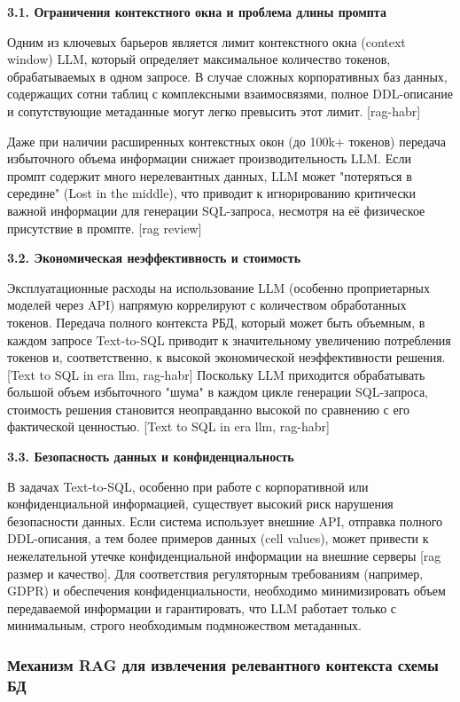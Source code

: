 \textbf{3.1. Ограничения контекстного окна и проблема длины промпта}

Одним из ключевых барьеров является лимит контекстного окна (context window) LLM, который определяет максимальное количество токенов, обрабатываемых в одном запросе. В случае сложных корпоративных баз данных, содержащих сотни таблиц с комплексными взаимосвязями, полное DDL-описание и сопутствующие метаданные могут легко превысить этот лимит. [rag-habr]

Даже при наличии расширенных контекстных окон (до 100k+ токенов) передача избыточного объема информации снижает производительность LLM. Если промпт содержит много нерелевантных данных, LLM может "потеряться в середине" (Lost in the middle), что приводит к игнорированию критически важной информации для генерации SQL-запроса, несмотря на её физическое присутствие в промпте. [rag review]

\textbf{3.2. Экономическая неэффективность и стоимость}

Эксплуатационные расходы на использование LLM (особенно проприетарных моделей через API) напрямую коррелируют с количеством обработанных токенов. Передача полного контекста РБД, который может быть объемным, в каждом запросе Text-to-SQL приводит к значительному увеличению потребления токенов и, соответственно, к высокой экономической неэффективности решения. [Text to SQL in era llm, rag-habr] Поскольку LLM приходится обрабатывать большой объем избыточного "шума" в каждом цикле генерации SQL-запроса, стоимость решения становится неоправданно высокой по сравнению с его фактической ценностью. [Text to SQL in era llm, rag-habr]

\textbf{3.3. Безопасность данных и конфиденциальность}

В задачах Text-to-SQL, особенно при работе с корпоративной или конфиденциальной информацией, существует высокий риск нарушения безопасности данных. Если система использует внешние API, отправка полного DDL-описания, а тем более примеров данных (cell values), может привести к нежелательной утечке конфиденциальной информации на внешние серверы [rag размер и качество]. Для соответствия регуляторным требованиям (например, GDPR) и обеспечения конфиденциальности, необходимо минимизировать объем передаваемой информации и гарантировать, что LLM работает только с минимальным, строго необходимым подмножеством метаданных.

\subsubsection{Механизм RAG для извлечения релевантного контекста схемы БД}

